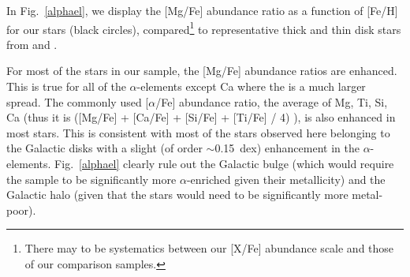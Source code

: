 \documentclass[a4paper,fleqn,usenatbib]{mnras}
\begin{document}
In Fig.~\ref{alphael}, we display the [Mg/Fe] abundance ratio as a function of [Fe/H] for our stars (black circles), compared\footnote{There may to be systematics between our [X/Fe] abundance scale and those of our comparison samples.} to representative thick and thin disk stars from \cite[open red squares]{Bensby2014} and \cite[open orange triangles]{Adibekyan2012}. 

For most of the stars in our sample, the [Mg/Fe] abundance ratios are enhanced. This is true for all of the $\alpha$-elements except Ca where the is a much larger spread. The commonly used [$\alpha$/Fe] abundance ratio, the average of Mg, Ti, Si, Ca (thus it is ([Mg/Fe] + [Ca/Fe] + [Si/Fe] + [Ti/Fe] / 4) ), is also enhanced in most stars. This is consistent with most of the stars observed here belonging to the Galactic disks with a slight (of order $\sim$0.15~dex) enhancement in the $\alpha$-elements. Fig.~\ref{alphael} clearly rule out the Galactic bulge (which would require the sample to be significantly more $\alpha$-enriched given their metallicity) and the Galactic halo (given that the stars would need to be significantly more metal-poor). %
\end{document}
